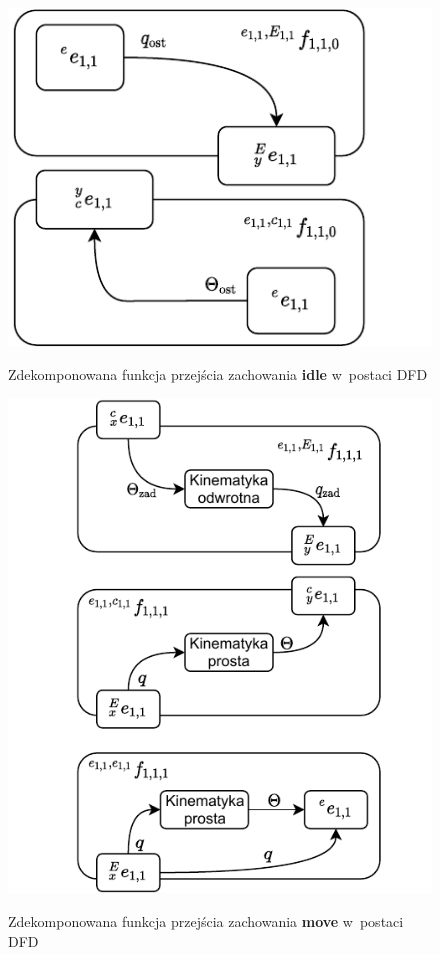 \begin{figure}
    \centering
    \includegraphics[width=\columnwidth]{figures/ISR-ve-manip-fp-idle.pdf}
    \label{fig:ve-manip-fp-idle}
    \caption{Zdekomponowana funkcja przejścia zachowania \textbf{idle} w~postaci DFD}
\end{figure}

\begin{figure}
    \centering
    \includegraphics[width=\columnwidth]{figures/ISR-ve-manip-fp-move.pdf}
    \label{fig:ve-manip-fp-move}
    \caption{Zdekomponowana funkcja przejścia zachowania \textbf{move} w~postaci DFD}
\end{figure}
